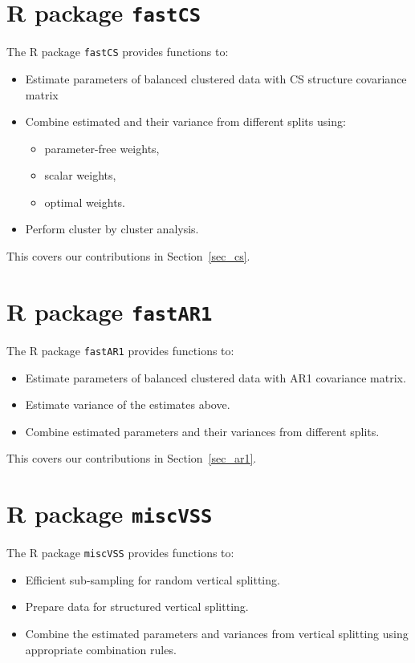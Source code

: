 \documentclass[11pt,a5paper,twoside]{book}
\begin{document}
\section{R package {\tt{fastCS}}}
\label{fascs}
The R package {\tt{fastCS}} provides functions to:

\begin{itemize}
\item Estimate parameters of balanced clustered data with CS structure covariance matrix 
\item Combine estimated and their variance from different splits using:
\vspace{-\topsep}
\begin{itemize}
\item parameter-free weights,
\item scalar weights,
\item optimal weights.
\end{itemize}
\vspace{-\topsep}
\item Perform cluster by cluster analysis.
\end{itemize}

This covers our contributions in Section~\ref{sec_cs}.

\section{R package {\tt{fastAR1}}}
\label{fastar1}
The R package {\tt{fastAR1}} provides functions to:

\begin{itemize}
\item Estimate parameters of balanced clustered data with AR1 covariance matrix.
\item Estimate variance of the estimates above.
\item Combine estimated parameters and their variances from different splits.
\end{itemize}

This covers our contributions in Section~\ref{sec_ar1}.


\section{R package {\tt{miscVSS}}}
\label{sec_miscVSS}
The R package {\tt{miscVSS}} provides functions to:

\begin{itemize}
\item Efficient sub-sampling for random vertical splitting.
\item Prepare data for structured vertical splitting.
\item Combine the estimated parameters and variances from vertical splitting using appropriate combination rules.
\end{itemize}
\end{document}
